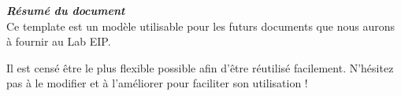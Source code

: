 \thispagestyle{empty}
\vspace*{10mm}

\textbf{\emph{\textcolor{epiBlue}{\large{Résumé du document} } } }\\

Ce template est un modèle utilisable pour les futurs documents que nous aurons à fournir au Lab EIP.

Il est censé être le plus flexible possible afin d'être réutilisé facilement.
N'hésitez pas à le modifier et à l'améliorer pour faciliter son utilisation !
\newpage
